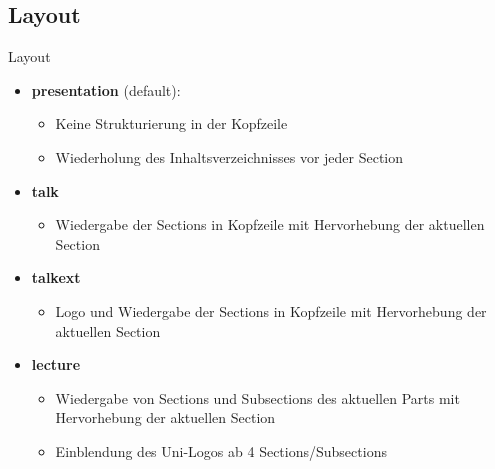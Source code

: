 \documentclass[12pt,rgb]{beamer}
\begin{document}
    \subsection{Layout}
    \begin{frame}{Layout}
        \begin{itemize}
            \item \textbf{presentation} (default): 
            \begin{itemize}
                \item Keine Strukturierung in der Kopfzeile
                \item Wiederholung des Inhaltsverzeichnisses vor jeder Section
            \end{itemize}
            \item \textbf{talk}
            \begin{itemize}
                \item Wiedergabe der Sections in Kopfzeile mit Hervorhebung der aktuellen Section
            \end{itemize}
            \item \textbf{talkext}
            \begin{itemize}
                \item Logo und Wiedergabe der Sections in Kopfzeile mit Hervorhebung der aktuellen Section
            \end{itemize}
            \item \textbf{lecture}
            \begin{itemize}
                \item Wiedergabe von Sections und Subsections des aktuellen Parts mit Hervorhebung der aktuellen Section
                \item Einblendung des Uni-Logos ab 4 Sections/Subsections
            \end{itemize}
        \end{itemize}
    \end{frame}
\end{document}
